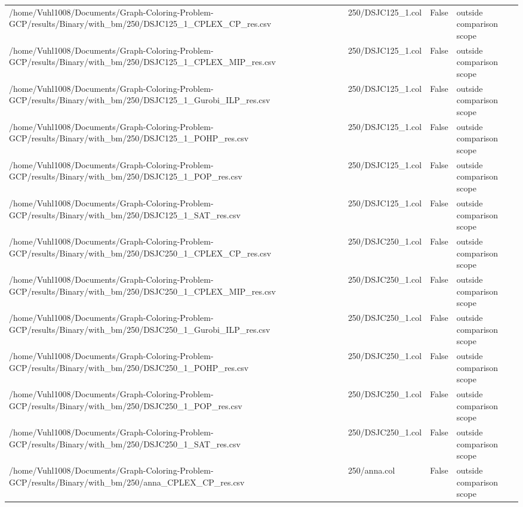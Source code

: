 \begin{table}[htbp]
\begin{tabular}{llll}
/home/Vuhl1008/Documents/Graph-Coloring-Problem-GCP/results/Binary/with\_bm/250/DSJC125\_1\_CPLEX\_CP\_res.csv & 250/DSJC125\_1.col & False & outside comparison scope \\
/home/Vuhl1008/Documents/Graph-Coloring-Problem-GCP/results/Binary/with\_bm/250/DSJC125\_1\_CPLEX\_MIP\_res.csv & 250/DSJC125\_1.col & False & outside comparison scope \\
/home/Vuhl1008/Documents/Graph-Coloring-Problem-GCP/results/Binary/with\_bm/250/DSJC125\_1\_Gurobi\_ILP\_res.csv & 250/DSJC125\_1.col & False & outside comparison scope \\
/home/Vuhl1008/Documents/Graph-Coloring-Problem-GCP/results/Binary/with\_bm/250/DSJC125\_1\_POHP\_res.csv & 250/DSJC125\_1.col & False & outside comparison scope \\
/home/Vuhl1008/Documents/Graph-Coloring-Problem-GCP/results/Binary/with\_bm/250/DSJC125\_1\_POP\_res.csv & 250/DSJC125\_1.col & False & outside comparison scope \\
/home/Vuhl1008/Documents/Graph-Coloring-Problem-GCP/results/Binary/with\_bm/250/DSJC125\_1\_SAT\_res.csv & 250/DSJC125\_1.col & False & outside comparison scope \\
/home/Vuhl1008/Documents/Graph-Coloring-Problem-GCP/results/Binary/with\_bm/250/DSJC250\_1\_CPLEX\_CP\_res.csv & 250/DSJC250\_1.col & False & outside comparison scope \\
/home/Vuhl1008/Documents/Graph-Coloring-Problem-GCP/results/Binary/with\_bm/250/DSJC250\_1\_CPLEX\_MIP\_res.csv & 250/DSJC250\_1.col & False & outside comparison scope \\
/home/Vuhl1008/Documents/Graph-Coloring-Problem-GCP/results/Binary/with\_bm/250/DSJC250\_1\_Gurobi\_ILP\_res.csv & 250/DSJC250\_1.col & False & outside comparison scope \\
/home/Vuhl1008/Documents/Graph-Coloring-Problem-GCP/results/Binary/with\_bm/250/DSJC250\_1\_POHP\_res.csv & 250/DSJC250\_1.col & False & outside comparison scope \\
/home/Vuhl1008/Documents/Graph-Coloring-Problem-GCP/results/Binary/with\_bm/250/DSJC250\_1\_POP\_res.csv & 250/DSJC250\_1.col & False & outside comparison scope \\
/home/Vuhl1008/Documents/Graph-Coloring-Problem-GCP/results/Binary/with\_bm/250/DSJC250\_1\_SAT\_res.csv & 250/DSJC250\_1.col & False & outside comparison scope \\
/home/Vuhl1008/Documents/Graph-Coloring-Problem-GCP/results/Binary/with\_bm/250/anna\_CPLEX\_CP\_res.csv & 250/anna.col & False & outside comparison scope \\

\end{tabular}
\end{table}
